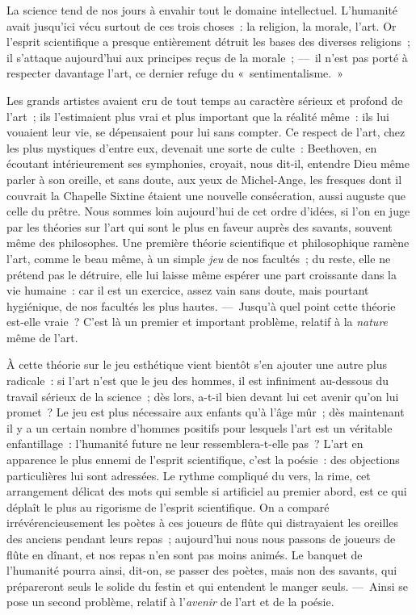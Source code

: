 \documentclass[french,twoside]{book} %
\begin{document}
\noindent  La science tend de nos jours à envahir tout le domaine intellectuel. L’humanité avait jusqu’ici vécu surtout de ces trois choses : la religion, la morale, l’art. Or l’esprit scientifique a presque entièrement détruit les bases des diverses religions ; il s’attaque aujourd’hui aux principes reçus de la morale ; — il n’est pas porté à respecter davantage l’art, ce dernier refuge du « sentimentalisme. »\par
Les grands artistes avaient cru de tout temps au caractère sérieux et profond de l’art ; ils l’estimaient plus vrai et plus important que la réalité même : ils lui vouaient leur vie, se dépensaient pour lui sans compter. Ce respect de l’art, chez les plus mystiques d’entre eux, devenait une sorte de culte : Beethoven, en écoutant intérieurement ses symphonies, croyait, nous dit-il, entendre Dieu même parler à son oreille, et sans doute, aux yeux de Michel-Ange, les fresques dont il couvrait la Chapelle Sixtine étaient une nouvelle consécration, aussi auguste que celle du prêtre. Nous sommes loin aujourd’hui de cet ordre d’idées, si l’on en juge par les théories sur l’art qui sont le plus en faveur auprès des savants, souvent même des philosophes. Une première théorie scientifique et philosophique ramène l’art, comme le beau même, à un simple \emph{jeu} de nos facultés ; du reste,  elle ne prétend pas le détruire, elle lui laisse même espérer une part croissante dans la vie humaine : car il est un exercice, assez vain sans doute, mais pourtant hygiénique, de nos facultés les plus hautes. — Jusqu’à quel point cette théorie est-elle vraie ? C’est là un premier et important problème, relatif à la \emph{nature} même de l’art.\par
À cette théorie sur le jeu esthétique vient bientôt s’en ajouter une autre plus radicale : si l’art n’est que le jeu des hommes, il est infiniment au-dessous du travail sérieux de la science ; dès lors, a-t-il bien devant lui cet avenir qu’on lui promet ? Le jeu est plus nécessaire aux enfants qu’à l’âge mûr ; dès maintenant il y a un certain nombre d’hommes positifs pour lesquels l’art est un véritable enfantillage : l’humanité future ne leur ressemblera-t-elle pas ? L’art en apparence le plus ennemi de l’esprit scientifique, c’est la poésie : des objections particulières lui sont adressées. Le rythme compliqué du vers, la rime, cet arrangement délicat des mots qui semble si artificiel au premier abord, est ce qui déplaît le plus au rigorisme de l’esprit scientifique. On a comparé irrévérencieusement les poètes à ces joueurs de flûte qui distrayaient les oreilles des anciens pendant leurs repas ; aujourd’hui nous nous passons de joueurs de flûte en dînant, et nos repas n’en sont pas moins animés. Le banquet de l’humanité pourra ainsi, dit-on, se passer des poètes, mais non des savants, qui prépareront seuls le solide du festin et qui entendent le  manger seuls. — Ainsi se pose un second problème, relatif à l’\emph{avenir} de l’art et de la poésie.\par
\end{document}
